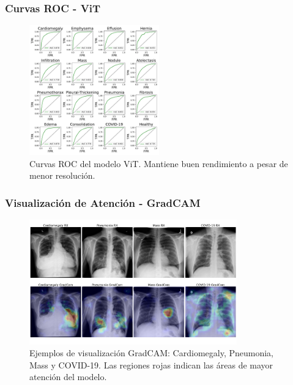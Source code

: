 \begin{frame}
\frametitle{Curvas ROC - ViT}
\begin{figure}[ht!]
    \centering
    \includegraphics[width=0.5\textwidth]{../Chapters/4. ViT-Lung/images/ROC_AUC_ViT.pdf}
    \caption{Curvas ROC del modelo ViT. Mantiene buen rendimiento a pesar de menor resolución.}
\end{figure}
\end{frame}

\begin{frame}
\frametitle{Visualización de Atención - GradCAM}
\begin{figure}[ht!]
    \centering
    \includegraphics[width=0.8\textwidth]{../Chapters/4. ViT-Lung/images/vlgrid.png}
    \caption{Ejemplos de visualización GradCAM: Cardiomegaly, Pneumonia, Mass y COVID-19. Las regiones rojas indican las áreas de mayor atención del modelo.}
\end{figure}
\end{frame}

